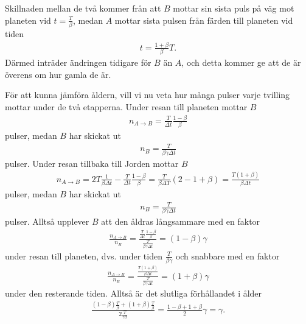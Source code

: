 Skillnaden mellan de två kommer från att $B$ mottar sin sista puls på väg mot planeten vid $t = \frac{T}{\beta}$, medan $A$ mottar sista pulsen från färden till planeten vid tiden
\begin{align*}
	t = \frac{1 + \beta}{\beta}T.
\end{align*}
Därmed inträder ändringen tidigare för $B$ än $A$, och detta kommer ge att de är överens om hur gamla de är.

För att kunna jämföra åldern, vill vi nu veta hur många pulser varje tvilling mottar under de två etapperna. Under resan till planeten mottar $B$
\begin{align*}
	n_{A\to B} = \frac{T}{\Delta t}\frac{1 - \beta}{\beta}
\end{align*}
pulser, medan $B$ har skickat ut
\begin{align*}
	n_{B} = \frac{T}{\beta\gamma\Delta t}
\end{align*}
pulser. Under resan tillbaka till Jorden mottar $B$
\begin{align*}
	n_{A\to B} = 2T\frac{1}{\beta\Delta t} - \frac{T}{\Delta t}\frac{1 - \beta}{\beta} = \frac{T}{\beta\Delta T}(2 - 1 + \beta) = \frac{T(1 + \beta)}{\beta\Delta t}
\end{align*}
pulser, medan $B$ har skickat ut
\begin{align*}
	n_{B} = \frac{T}{\beta\gamma\Delta t}
\end{align*}
pulser. Alltså upplever $B$ att den åldras långsammare med en faktor
\begin{align*}
	\frac{n_{A\to B}}{n_{B}} = \frac{\frac{T}{\Delta t}\frac{1 - \beta}{\beta}}{\frac{T}{\beta\gamma\Delta t}} = (1 - \beta)\gamma
\end{align*}
under resan till planeten, dvs. under tiden $\frac{T}{\beta\gamma}$ och snabbare med en faktor
\begin{align*}
	\frac{n_{A\to B}}{n_{B}} = \frac{\frac{T(1 + \beta)}{\beta\Delta t}}{\frac{T}{\beta\gamma\Delta t}} = (1 + \beta)\gamma
\end{align*}
under den resterande tiden. Alltså är det slutliga förhållandet i ålder
\begin{align*}
	\frac{(1 - \beta)\frac{T}{\beta} + (1 + \beta)\frac{T}{\beta}}{2\frac{T}{\gamma\beta}} = \frac{1 - \beta + 1 + \beta}{2}\gamma = \gamma.
\end{align*}

